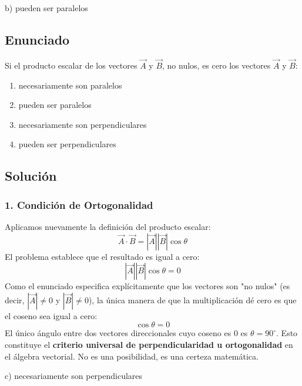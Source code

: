 \documentclass[12pt, a4paper]{article}
\begin{document}
\begin{tcolorbox}[colback=green!5!white, colframe=green!50!black, title=Respuesta Final]
\centering \Large b) pueden ser paralelos
\end{tcolorbox}

\newpage


\subsection*{Enunciado}
Si el producto escalar de los vectores $\vec{A}$ y $\vec{B}$, no nulos, es cero los vectores $\vec{A}$ y $\vec{B}$:
\begin{enumerate}[label=\alph*)]
    \item necesariamente son paralelos
    \item pueden ser paralelos
    \item necesariamente son perpendiculares
    \item pueden ser perpendiculares
\end{enumerate}

\subsection*{Solución}

\subsubsection*{1. Condición de Ortogonalidad}
Aplicamos nuevamente la definición del producto escalar:
$$ \vec{A} \cdot \vec{B} = |\vec{A}| |\vec{B}| \cos\theta $$
El problema establece que el resultado es igual a cero:
$$ |\vec{A}| |\vec{B}| \cos\theta = 0 $$
Como el enunciado especifica explícitamente que los vectores son "no nulos" (es decir, $|\vec{A}| \neq 0$ y $|\vec{B}| \neq 0$), la única manera de que la multiplicación dé cero es que el coseno sea igual a cero:
$$ \cos\theta = 0 $$
El único ángulo entre dos vectores direccionales cuyo coseno es $0$ es $\theta = 90^\circ$. Esto constituye el \textbf{criterio universal de perpendicularidad u ortogonalidad} en el álgebra vectorial. No es una posibilidad, es una certeza matemática.

\begin{tcolorbox}[colback=green!5!white, colframe=green!50!black, title=Respuesta Final]
\centering \Large c) necesariamente son perpendiculares
\end{tcolorbox}
\end{document}
